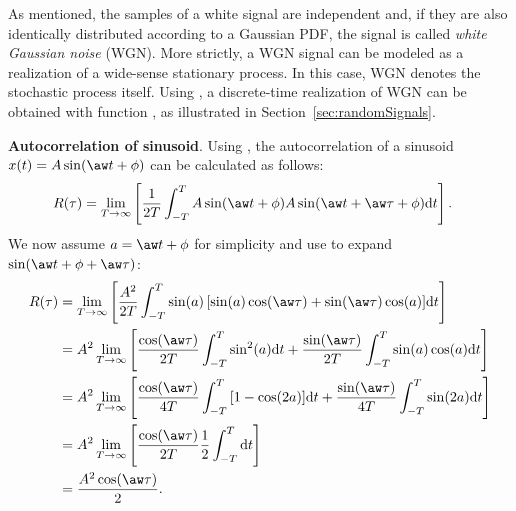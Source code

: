 As mentioned, the samples of a white signal are independent and, if they are also identically distributed according to a Gaussian PDF, the signal is called \emph{white Gaussian noise} (WGN). More strictly, a WGN signal can be modeled as a realization of a wide-sense stationary process. In this case, WGN denotes the stochastic process itself.
Using {\matlab}, a discrete-time realization of WGN can be obtained with function , as
illustrated in Section~\ref{sec:randomSignals}.
\eExample

\bExample \textbf{Autocorrelation of sinusoid}.
Using , the autocorrelation of a sinusoid $x(t)=A \sin(\aw t+\phi)$ can be calculated as follows:
\begin{align}
R(\tau) &= %
\lim_{T \rightarrow \infty} \left[ \frac 1 {2T} \int_{-T}^{T}{A\sin(\aw t + \phi) A\sin(\aw t + \aw \tau + \phi)} \textrm{d}t \right]. \nonumber
\end{align}
We now assume $a=\aw t+\phi$ for simplicity and use  to expand $\sin(\aw t + \phi + \aw \tau)$:
\begin{align}
R(\tau) &=\lim_{T \rightarrow \infty} \left[ \frac {A^2} {2T} \int_{-T}^{T}{\sin(a) \left[ \sin(a) \cos(\aw \tau) + \sin(\aw \tau) \cos(a) \right] } \textrm{d}t \right]  \nonumber \\
&=A^2 \lim_{T \rightarrow \infty} \left[ \frac {\cos(\aw \tau)} {2T}  \int_{-T}^{T}{\sin^2(a)} \textrm{d}t + \frac {\sin(\aw \tau)} {2T} \int_{-T}^{T}{\sin(a)\cos(a)} \textrm{d}t \right]  \nonumber \\
&= A^2 \lim_{T \rightarrow \infty} \left[ \frac {\cos(\aw \tau)}{4T}  \int_{-T}^{T}{[1-\cos(2a)]} \textrm{d}t + \frac{\sin(\aw \tau)}{4T} \int_{-T}^{T}{\sin(2a)} \textrm{d}t \right]  \nonumber \\ 
&=A^2 \lim_{T \rightarrow \infty} \left[ \frac {\cos(\aw \tau)}{2T}  \frac{1}{2}\int_{-T}^{T} \textrm{d}t \right]  \nonumber \\ 
&=\frac {A^2 \cos(\aw \tau)}{2}. \label{eq:sinusoidcorrelation}
\end{align}
